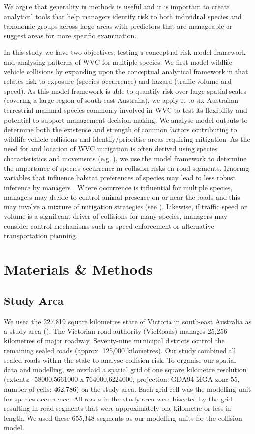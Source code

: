 We argue that generality in methods is useful and it is important to create analytical tools that help managers identify risk to both individual species and taxonomic groups across large areas with predictors that are manageable or suggest areas for more specific examination.

In this study we have two objectives; testing a conceptual risk model framework and analysing patterns of WVC for multiple species.  We first model wildlife vehicle collisions by expanding upon the conceptual analytical framework in  that relates risk to exposure (species occurrence) and hazard (traffic volume and speed).  As this model framework is able to quantify risk over large spatial scales (covering a large region of south-east Australia), we apply it to six Australian terrestrial mammal species commonly involved in WVC to test its flexibility and potential to support management decision-making.  We analyse model outputs to determine both the existence and strength of common factors contributing to wildlife-vehicle collisions and identify/prioritise areas requiring mitigation.  As the need for and location of WVC mitigation is often derived using species characteristics and movements (e.g. \cite{clev02}), we use the model framework to determine the importance of species occurrence in collision risks on road segments.  Ignoring variables that influence habitat preferences of species may lead to less robust inference by managers \citep{roge09}.  Where occurrence is influential for multiple species, managers may decide to control animal presence on or near the roads and this may involve a mixture of mitigation strategies (see \cite{beck10}).  Likewise, if traffic speed or volume is a significant driver of collisions for many species, managers may consider control mechanisms such as speed enforcement or alternative transportation planning.

\section{Materials \& Methods}

\subsection{Study Area}

We used the 227,819 square kilometres state of Victoria in south-east Australia as a study area (). The Victorian road authority (VicRoads) manages 25,256 kilometres of major roadway. Seventy-nine municipal districts control the remaining sealed roads (approx. 125,000 kilometres). Our study combined all sealed roads within the state to analyse collision risk. To organise our spatial data and modelling, we overlaid a spatial grid of one square kilometre resolution (extents: -58000,5661000 x 764000,6224000, projection: GDA94 MGA zone 55, number of cells: 462,786) on the study area. Each grid cell was the modelling unit for species occurrence. All roads in the study area were bisected by the grid resulting in road segments that were approximately one kilometre or less in length. We used these 655,348 segments as our modelling units for the collision model.

